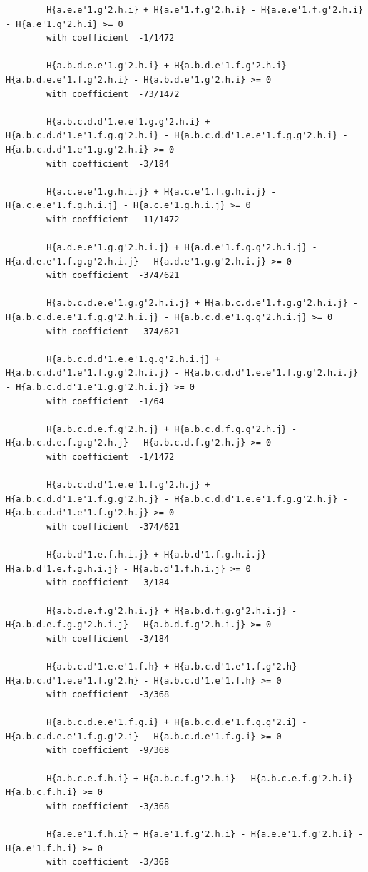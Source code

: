 \documentclass[11pt, a4paper]{kybernetika}
\begin{document}
\begin{verbatim}
		H{a.e.e'1.g'2.h.i} + H{a.e'1.f.g'2.h.i} - H{a.e.e'1.f.g'2.h.i} - H{a.e'1.g'2.h.i} >= 0
		with coefficient  -1/1472
		
		H{a.b.d.e.e'1.g'2.h.i} + H{a.b.d.e'1.f.g'2.h.i} - H{a.b.d.e.e'1.f.g'2.h.i} - H{a.b.d.e'1.g'2.h.i} >= 0
		with coefficient  -73/1472
		
		H{a.b.c.d.d'1.e.e'1.g.g'2.h.i} + H{a.b.c.d.d'1.e'1.f.g.g'2.h.i} - H{a.b.c.d.d'1.e.e'1.f.g.g'2.h.i} - H{a.b.c.d.d'1.e'1.g.g'2.h.i} >= 0
		with coefficient  -3/184
		
		H{a.c.e.e'1.g.h.i.j} + H{a.c.e'1.f.g.h.i.j} - H{a.c.e.e'1.f.g.h.i.j} - H{a.c.e'1.g.h.i.j} >= 0
		with coefficient  -11/1472
		
		H{a.d.e.e'1.g.g'2.h.i.j} + H{a.d.e'1.f.g.g'2.h.i.j} - H{a.d.e.e'1.f.g.g'2.h.i.j} - H{a.d.e'1.g.g'2.h.i.j} >= 0
		with coefficient  -374/621
		
		H{a.b.c.d.e.e'1.g.g'2.h.i.j} + H{a.b.c.d.e'1.f.g.g'2.h.i.j} - H{a.b.c.d.e.e'1.f.g.g'2.h.i.j} - H{a.b.c.d.e'1.g.g'2.h.i.j} >= 0
		with coefficient  -374/621
		
		H{a.b.c.d.d'1.e.e'1.g.g'2.h.i.j} + H{a.b.c.d.d'1.e'1.f.g.g'2.h.i.j} - H{a.b.c.d.d'1.e.e'1.f.g.g'2.h.i.j} - H{a.b.c.d.d'1.e'1.g.g'2.h.i.j} >= 0
		with coefficient  -1/64
		
		H{a.b.c.d.e.f.g'2.h.j} + H{a.b.c.d.f.g.g'2.h.j} - H{a.b.c.d.e.f.g.g'2.h.j} - H{a.b.c.d.f.g'2.h.j} >= 0
		with coefficient  -1/1472
		
		H{a.b.c.d.d'1.e.e'1.f.g'2.h.j} + H{a.b.c.d.d'1.e'1.f.g.g'2.h.j} - H{a.b.c.d.d'1.e.e'1.f.g.g'2.h.j} - H{a.b.c.d.d'1.e'1.f.g'2.h.j} >= 0
		with coefficient  -374/621
		
		H{a.b.d'1.e.f.h.i.j} + H{a.b.d'1.f.g.h.i.j} - H{a.b.d'1.e.f.g.h.i.j} - H{a.b.d'1.f.h.i.j} >= 0
		with coefficient  -3/184
		
		H{a.b.d.e.f.g'2.h.i.j} + H{a.b.d.f.g.g'2.h.i.j} - H{a.b.d.e.f.g.g'2.h.i.j} - H{a.b.d.f.g'2.h.i.j} >= 0
		with coefficient  -3/184
		
		H{a.b.c.d'1.e.e'1.f.h} + H{a.b.c.d'1.e'1.f.g'2.h} - H{a.b.c.d'1.e.e'1.f.g'2.h} - H{a.b.c.d'1.e'1.f.h} >= 0
		with coefficient  -3/368
		
		H{a.b.c.d.e.e'1.f.g.i} + H{a.b.c.d.e'1.f.g.g'2.i} - H{a.b.c.d.e.e'1.f.g.g'2.i} - H{a.b.c.d.e'1.f.g.i} >= 0
		with coefficient  -9/368
		
		H{a.b.c.e.f.h.i} + H{a.b.c.f.g'2.h.i} - H{a.b.c.e.f.g'2.h.i} - H{a.b.c.f.h.i} >= 0
		with coefficient  -3/368
		
		H{a.e.e'1.f.h.i} + H{a.e'1.f.g'2.h.i} - H{a.e.e'1.f.g'2.h.i} - H{a.e'1.f.h.i} >= 0
		with coefficient  -3/368
		

\end{verbatim}
\end{document}
